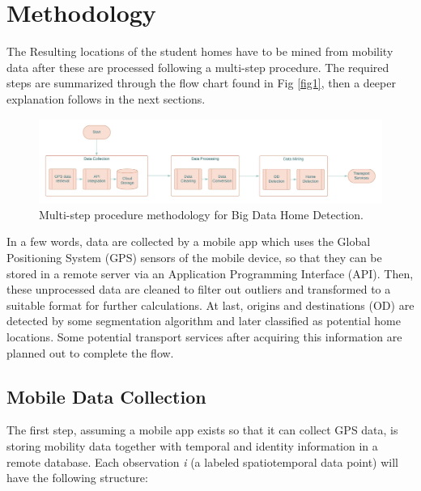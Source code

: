 \documentclass[runningheads]{llncs}
\begin{document}
\hypertarget{methodology}{%
\section{Methodology}\label{methodology}}

The Resulting locations of the student homes have to be mined from mobility data after these are processed following a multi-step procedure. The required steps are summarized through the flow chart found in Fig \ref{fig1}, then a deeper explanation follows in the next sections.

\begin{figure}

{\centering \includegraphics[width=0.9\linewidth]{paper/images/Methodology Home Detection} 

}

\caption{\label{fig1}Multi-step procedure methodology for Big Data Home Detection.}\label{fig:unnamed-chunk-1}
\end{figure}

In a few words, data are collected by a mobile app which uses the Global Positioning System (GPS) sensors of the mobile device, so that they can be stored in a remote server via an Application Programming Interface (API). Then, these unprocessed data are cleaned to filter out outliers and transformed to a suitable format for further calculations. At last, origins and destinations (OD) are detected by some segmentation algorithm and later classified as potential home locations. Some potential transport services after acquiring this information are planned out to complete the flow.

\hypertarget{mobile-data-collection}{%
\subsection{Mobile Data Collection}\label{mobile-data-collection}}

The first step, assuming a mobile app exists so that it can collect GPS data, is storing mobility data together with temporal and identity information in a remote database. Each observation \emph{i} (a labeled spatiotemporal data point) will have the following structure:
\end{document}
